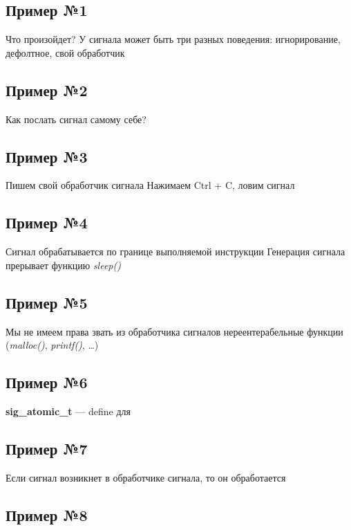 \documentclass[../../lectures.tex]{subfiles}
\begin{document}
\newpage
\subsection{Пример №1}
Что произойдет?
У сигнала может быть три разных поведения: игнорирование, дефолтное, свой обработчик\\

\subsection{Пример №2}
Как послать сигнал самому себе?

\subsection{Пример №3}
Пишем свой обработчик сигнала
Нажимаем Ctrl + C, ловим сигнал

\subsection{Пример №4}
Сигнал обрабатывается по границе выполняемой инструкции
Генерация сигнала прерывает функцию \emph{sleep()}

\subsection{Пример №5}
Мы не имеем права звать из обработчика сигналов нереентерабельные функции (\emph{malloc()}, \emph{printf()}, \dots)

\subsection{Пример №6}
\textbf{sig\_atomic\_t} --- define для 

\subsection{Пример №7}
Если сигнал возникнет в обработчике сигнала, то он обработается

\subsection{Пример №8}
\end{document}
